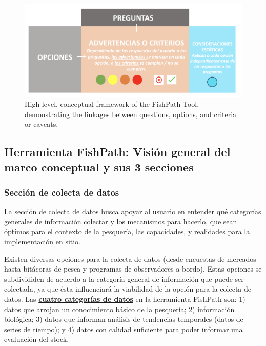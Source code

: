 \documentclass[
  11pt,
]{book}
\begin{document}
\begin{figure}
 
 {\centering \includegraphics[width=0.95\linewidth]{images/conceptual-framework-es} 
 
 }
 
 \caption{High level, conceptual framework of the FishPath Tool, demonstrating the linkages between questions, options, and criteria or caveats.}\label{fig:conceptual}
 \end{figure}

\hypertarget{herramienta-fishpath-visiuxf3n-general-del-marco-conceptual-y-sus-3-secciones}{%
\subsection{Herramienta FishPath: Visión general del marco conceptual y sus 3 secciones}\label{herramienta-fishpath-visiuxf3n-general-del-marco-conceptual-y-sus-3-secciones}}

\hypertarget{secciuxf3n-de-colecta-de-datos}{%
\subsubsection{Sección de colecta de datos}\label{secciuxf3n-de-colecta-de-datos}}

La sección de colecta de datos busca apoyar al usuario en entender qué categorías generales de información colectar y los mecanismos para hacerlo, que sean óptimos para el contexto de la pesquería, las capacidades, y realidades para la implementación en sitio.

Existen diversas opciones para la colecta de datos (desde encuestas de mercados hasta bitácoras de pesca y programas de observadores a bordo). Estas opciones se subdivididen de acuerdo a la categoría general de información que puede ser colectada, ya que ésta influenciará la viabilidad de la opción para la colecta de datos. Las \protect\hyperlink{Data-Categories}{\textbf{cuatro categorías de datos}} en la herramienta FishPath son: 1) datos que arrojan un conocimiento básico de la pesquería; 2) información biológica; 3) datos que informan análisis de tendencias temporales (datos de series de tiempo); y 4) datos con calidad suficiente para poder informar una evaluación del stock.
\end{document}
